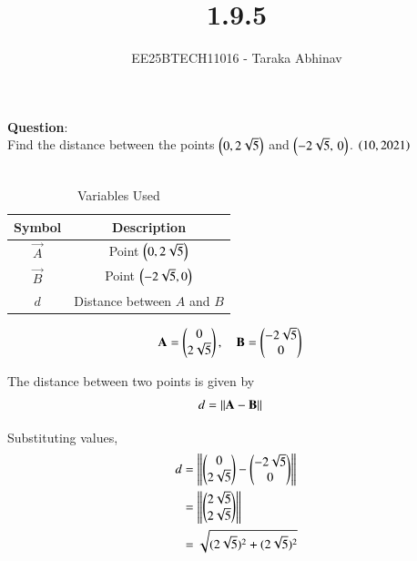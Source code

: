 \documentclass[journal]{IEEEtran}
\begin{document}


\title{1.9.5}
\author{EE25BTECH11016 - Taraka Abhinav}
{\let\newpage\relax\maketitle}

\renewcommand{\thefigure}{\theenumi}
\renewcommand{\thetable}{\theenumi}
\setlength{\intextsep}{10pt}

\renewcommand{\thetable}{\theenumi}

\textbf{Question}:\\
Find the distance between the points $\left(0,2\sqrt{5}\right)$ and $\left(-2\sqrt{5},\,0\right)$. \hfill $\left(10,2021\right)$
\\

\solution \\

\begin{table}[h!]    
  \centering
  \begin{tabular}{|c|c|}
  \hline
  Symbol & Description \\
  \hline
  $\vec{A}$ & Point $\left(0,2\sqrt{5}\right)$ \\
  $\vec{B}$ & Point $\left(-2\sqrt{5},0\right)$ \\
  $d$ & Distance between $A$ and $B$ \\
  \hline
  \end{tabular}
  \caption{Variables Used}
  \label{tab10.5.8.2}
\end{table}

\begin{align}
\mathbf{A} &= \begin{pmatrix}0\\2\sqrt{5}\end{pmatrix}, \quad 
\mathbf{B} = \begin{pmatrix}-2\sqrt{5}\\0\end{pmatrix}
\end{align}

The distance between two points is given by
\begin{align}
d &= \left\lVert\mathbf{A}-\mathbf{B}\right\rVert
\end{align}

Substituting values,
\begin{align}
d &= \left\lVert\begin{pmatrix}0\\2\sqrt{5}\end{pmatrix}-\begin{pmatrix}-2\sqrt{5}\\0\end{pmatrix}\right\rVert \\ 
  &= \left\lVert\begin{pmatrix}2\sqrt{5}\\2\sqrt{5}\end{pmatrix}\right\rVert \\ 
  &= \sqrt{(2\sqrt{5})^2 + (2\sqrt{5})^2}
\end{align}
\end{document}
